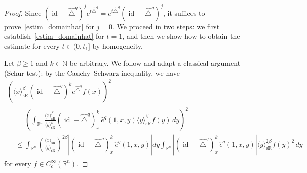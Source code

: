 \documentclass[AHL,Unicode,published]{cedram}
\newcommand*\R{\mathbb{R}}
\newcommand*\N{\mathbb{N}}
\DeclareMathOperator{\id}{id}
\DeclareMathOperator{\sR}{sR}
\renewcommand{\geq}{\geqslant}
\renewcommand{\leq}{\leqslant}
\begin{document}
\begin{proof}
Since $(\id - \widehat{\triangle}^q)^j e^{t\widehat{\triangle}^q} = e^{t\widehat{\triangle}^q} (\id - \widehat{\triangle}^q)^j$, it suffices to prove~\eqref{estim_domainhat} for $j=0$. We proceed in two steps: we first establish~\eqref{estim_domainhat} for $t=1$, and then we show how to obtain the estimate for every $t\in(0,t_1]$ by homogeneity.

Let $\beta\geq 1$ and $k\in\N$ be arbitrary. We follow and adapt a classical argument (Schur test): by the Cauchy--Schwarz inequality, we have
\begin{multline}\label{ineg_schur}
\left(\langle x\rangle_{\sR}^\beta \left(\id - \widehat{\triangle}^q\right)^k e^{\widehat{\triangle}^q} f(x) \right)^2\\
\begin{aligned}
&= \left(\int_{\R^n} \frac{\langle x\rangle_{\sR}^\beta}{\langle y\rangle_{\sR}^\beta} \left(\id - \widehat{\triangle}^q\right)_x^k\, \widehat{e}^q(1,x,y) \langle y\rangle_{\sR}^\beta f(y)\, dy \right)^2 \\
&\leq \int_{\R^n} \left(\frac{\langle x\rangle_{\sR}}{\langle y\rangle_{\sR}} \right)^{2\beta} \!\left\vert \left(\id - \widehat{\triangle}^q\right)_x^k\, \widehat{e}^q(1,x,y) \right\vert\! dy \int_{\R^n} \left\vert \left(\id - \widehat{\triangle}^q\right)_x^k\, \widehat{e}^q(1,x,y) \right\vert \langle y\rangle_{\sR}^{2\beta} f(y)^2\, dy
\end{aligned}
\end{multline}
for every $f\in C^\infty_c(\R^n)$.


\end{proof}
\end{document}
